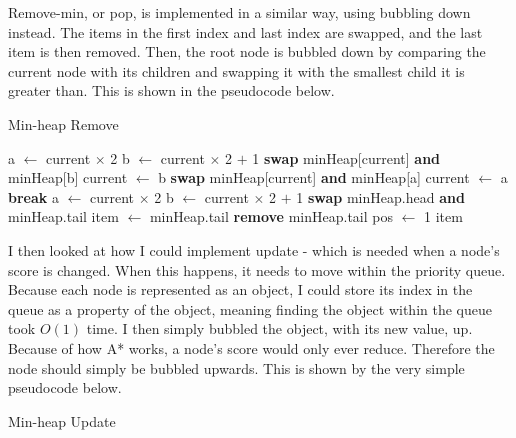 \documentclass[titlepage]{article}
\begin{document}
Remove-min, or pop, is implemented in a similar way, using bubbling down instead. The items in the first index and last index are swapped, and the last item is then removed. Then, the root node is bubbled down by comparing the current node with its children and swapping it with the smallest child it is greater than. This is shown in the pseudocode below.

\begin{algorithm}[H]
\caption{Min-heap Remove}
\begin{algorithmic}[1]
		\State a $\gets$ current $\times$ 2
		\State b $\gets$ current $\times$ 2 $+$ 1
				\State \textbf{swap} minHeap[current] \textbf{and} minHeap[b]
				\State current $\gets$ b
				\State \textbf{swap} minHeap[current] \textbf{and} minHeap[a]
				\State current $\gets$ a
			\Else
				\State \textbf{break}
			\EndIf
			\State a $\gets$ current $\times$ 2
			\State b $\gets$ current $\times$ 2 $+$ 1
		\EndWhile
	\EndProcedure
	\State
		\State \textbf{swap} minHeap.head \textbf{and} minHeap.tail
		\State item $\gets$ minHeap.tail
		\State \textbf{remove} minHeap.tail
		\State pos $\gets$ 1
		\State {}
		\State \Return item
	\EndProcedure
\end{algorithmic}
\end{algorithm}

I then looked at how I could implement update - which is needed when a node's score is changed. When this happens, it needs to move within the priority queue. Because each node is represented as an object, I could store its index in the queue as a property of the object, meaning finding the object within the queue took $O(1)$ time. I then simply bubbled the object, with its new value, up. Because of how A* works, a node's score would only ever reduce. Therefore the node should simply be bubbled upwards. This is shown by the very simple pseudocode below.

\begin{algorithm}[H]
\caption{Min-heap Update}
\begin{algorithmic}[1]
		\State {}
	\EndProcedure
\end{algorithmic}
\end{algorithm}
\end{document}
